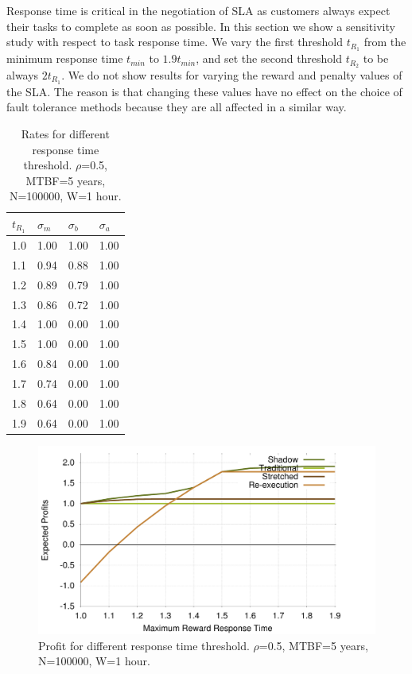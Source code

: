 Response time is critical in the negotiation of SLA as customers
always expect their tasks to complete as soon as possible. In this
section we show a sensitivity study with respect to task response
time. We vary the first threshold $t_{R_1}$ from the minimum response
time $t_{min}$ to $1.9t_{min}$, and set the second threshold $t_{R_2}$
to be always $2t_{R_1}$. We do not show results for varying the reward
and penalty values of the SLA. The reason is that changing these
values have no effect on the choice of fault tolerance methods because
they are all affected in a similar way.

\begin{table}[!h]\small
	\caption{Rates for different response time threshold. $\rho$=0.5, MTBF=5 years, N=100000, W=1 hour.}
	\centering
		\begin{tabular}{|p{1cm}|  p{1cm}|p{1cm}|p{1cm}|}
		\hline
		$t_{R_1}$ & $\sigma_m$ & $\sigma_b$ & $\sigma_a$ \\
		\hline
		1.0	&	1.00 & 	1.00 &	1.00 \\
		\hline
		1.1	&	0.94 &	0.88 &	1.00 \\
		\hline
		1.2	&	0.89 &	0.79 &	1.00 \\
		\hline
		1.3	&	0.86 &	0.72 &	1.00 \\
		\hline
		1.4	&	1.00 &	0.00 &	1.00 \\
		\hline
		1.5	&	1.00 &	0.00 &	1.00 \\
		\hline
		1.6	&	0.84 &	0.00 &	1.00 \\
		\hline
		1.7	&	0.74 &	0.00 &	1.00 \\
		\hline
		1.8	&	0.64 &	0.00 &	1.00 \\
		\hline
		1.9	&	0.64 &	0.00 &	1.00 \\
		\hline
		\end{tabular}
	\label{tbl:t}
\end{table}

\begin{figure}[!h]	
	\begin{center}
		\includegraphics[width=\columnwidth]{Figures/t_profit}
	\end{center}
	\caption{Profit for different response time threshold. $\rho$=0.5, MTBF=5 years, N=100000, W=1 hour.}
	\label{fig:t}
\end{figure}

